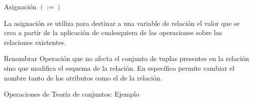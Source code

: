\begin{frame}{Asignaci\'on $(:=)$}

    La asignaci\'on se utiliza para destinar a una variable
    de relaci\'on el valor que se crea a partir de la aplicaci\'on
    de cualesquiera de las operaciones sobre las relaciones
    existentes.
\end{frame}


\begin{frame}{Renombrar}
    Operaci\'on que no afecta el conjunto de
    tuplas presentes en la relaci\'on sino que modifica
    el esquema de la relaci\'on. En espec\'ifico permite
    cambiar el nombre tanto de los atributos como el de la relaci\'on.
\end{frame}

\begin{frame}{Operaciones de Teor\'ia de conjuntos: Ejemplo}
    \centering
\end{frame}
